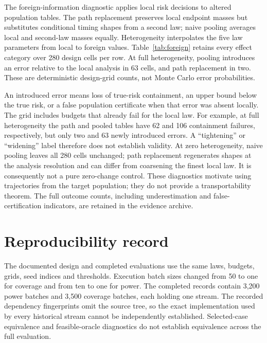 The foreign-information diagnostic applies local risk decisions to altered population tables. The path replacement preserves local endpoint masses but substitutes conditional timing shapes from a second law; naive pooling averages local and second-law masses equally. Heterogeneity interpolates the five law parameters from local to foreign values. Table~\ref{tab:foreign} retains every effect category over 280 design cells per row. At full heterogeneity, pooling introduces an error relative to the local analysis in 63 cells, and path replacement in two. These are deterministic design-grid counts, not Monte Carlo error probabilities.

\begin{table}[!htbp]\centering\small
\caption{Foreign-information effects relative to the local analysis. Each row sums to 280. NC: no change; BT: tightening without a newly introduced error; CW: widening; EB: newly introduced erroneous bound; MI: model incompatible. Labels classify relative effects, not validity under the local true law.}\label{tab:foreign}

\end{table}

An introduced error means loss of true-risk containment, an upper bound below the true risk, or a false population certificate when that error was absent locally. The grid includes budgets that already fail for the local law. For example, at full heterogeneity the path and pooled tables have 62 and 106 containment failures, respectively, but only two and 63 newly introduced errors. A ``tightening'' or ``widening'' label therefore does not establish validity. At zero heterogeneity, naive pooling leaves all 280 cells unchanged; path replacement regenerates shapes at the analysis resolution and can differ from coarsening the finest local law. It is consequently not a pure zero-change control. These diagnostics motivate using trajectories from the target population; they do not provide a transportability theorem. The full outcome counts, including underestimation and false-certification indicators, are retained in the evidence archive.

\section{Reproducibility record}
The documented design and completed evaluations use the same laws, budgets, grids, seed indices and thresholds. Execution batch sizes changed from 50 to one for coverage and from ten to one for power. The completed records contain 3,200 power batches and 3,500 coverage batches, each holding one stream. The recorded dependency fingerprints omit the source tree, so the exact implementation used by every historical stream cannot be independently established. Selected-case equivalence and feasible-oracle diagnostics do not establish equivalence across the full evaluation.

